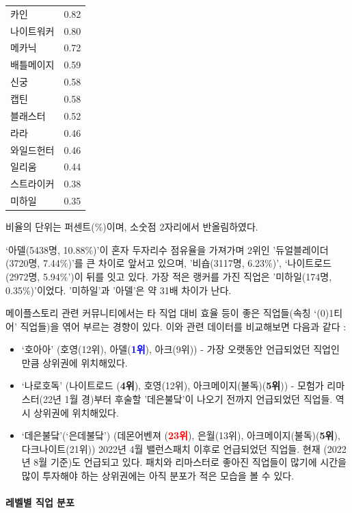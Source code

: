 \documentclass[
]{article}
\begin{document}
\begin{table}[H]
\begin{tabular}[t]{lr}
카인 & 0.82\\
나이트워커 & 0.80\\
\addlinespace
메카닉 & 0.72\\
배틀메이지 & 0.59\\
신궁 & 0.58\\
캡틴 & 0.58\\
블래스터 & 0.52\\
\addlinespace
라라 & 0.46\\
와일드헌터 & 0.46\\
일리움 & 0.44\\
스트라이커 & 0.38\\
미하일 & 0.35\\
\bottomrule
\end{tabular}
\end{table}

비율의 단위는 퍼센트(\%)이며, 소숫점 2자리에서 반올림하였다.

`아델(5438명, 10.88\%)'이 혼자 두자리수 점유율을 가져가며 2위인
'듀얼블레이더(3720명, 7.44\%)'를 큰 차이로 앞서고 있으며, '비숍(3117명,
6.23\%)', `나이트로드(2972명, 5.94\%')이 뒤를 잇고 있다. 가장 적은
랭커를 가진 직업은 '미하일(174명, 0.35\%)'이었다. '미하일'과 '아델'은 약
31배 차이가 난다.

메이플스토리 관련 커뮤니티에서는 타 직업 대비 효율 등이 좋은 직업들(속칭
`(0)1티어' 직업들)을 엮어 부르는 경향이 있다. 이와 관련 데이터를
비교해보면 다음과 같다 :

\begin{itemize}
\item
  `호아아' (호영(12위), 아델(\textbf{\textcolor{blue}{1위}}), 아크(9위))
  - 가장 오랫동안 언급되었던 직업인 만큼 상위권에 위치해있다.
\item
  `나로호독' (나이트로드 (\textbf{4위}), 호영(12위),
  아크메이지(불독)(\textbf{5위})) - 모험가 리마스터(22년 1월 경)부터
  후술할 '데은불닼'이 나오기 전까지 언급되었던 직업들. 역시 상위권에
  위치해있다.
\item
  `데은불닼'(`은데불닼') (데몬어벤져 (\textbf{\textcolor{red}{23위}}),
  은월(13위), 아크메이지(불독)(\textbf{5위}), 다크나이트(21위)) 2022년
  4월 밸런스패치 이후로 언급되었던 직업들. 현재 (2022년 8월 기준)도
  언급되고 있다. 패치와 리마스터로 좋아진 직업들이 많기에 시간을 많이
  투자해야 하는 상위권에는 아직 분포가 적은 모습을 볼 수 있다.
\end{itemize}

\hypertarget{uxb808uxbca8uxbcc4-uxc9c1uxc5c5-uxbd84uxd3ec}{%
\paragraph{레벨별 직업
분포}\label{uxb808uxbca8uxbcc4-uxc9c1uxc5c5-uxbd84uxd3ec}}
\end{document}
